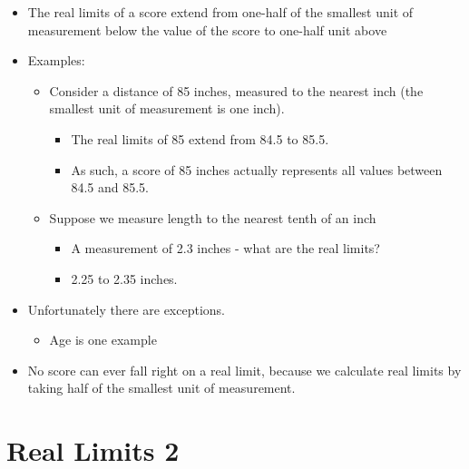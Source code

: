 \documentclass[12pt]{article}
\begin{document}
\begin{itemize}
\itemsep1pt\parskip0pt
\item
  The real limits of a score extend from one-half of the smallest unit
  of measurement below the value of the score to one-half unit above
\item
  Examples:

  \begin{itemize}
  \itemsep1pt\parskip0pt
  \item
    Consider a distance of 85 inches, measured to the nearest inch (the
    smallest unit of measurement is one inch).

    \begin{itemize}
    \itemsep1pt\parskip0pt
    \item
      The real limits of 85 extend from 84.5 to 85.5.
    \item
      As such, a score of 85 inches actually represents all values
      between 84.5 and 85.5.
    \end{itemize}
  \item
    Suppose we measure length to the nearest tenth of an inch

    \begin{itemize}
    \itemsep1pt\parskip0pt
    \item
      A measurement of 2.3 inches - what are the real limits?
    \item
      2.25 to 2.35 inches.
    \end{itemize}
  \end{itemize}
\item
  Unfortunately there are exceptions.

  \begin{itemize}
  \itemsep1pt\parskip0pt
  \item
    Age is one example
  \end{itemize}
\item
  No score can ever fall right on a real limit, because we calculate
  real limits by taking half of the smallest unit of measurement.
\end{itemize}

\section{Real Limits 2}\label{real-limits-2}
\end{document}
